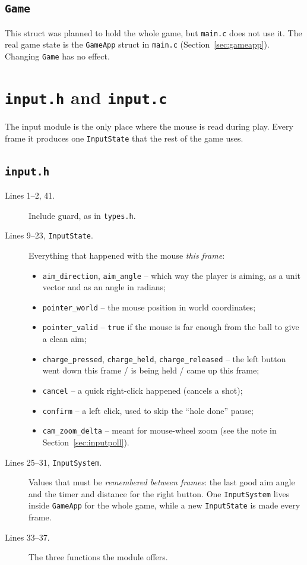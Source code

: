 \documentclass[11pt,a4paper]{article}
\newcommand{\code}[3]{}
\begin{document}
\subsection{\texttt{Game}}

\code{types.h}{98}{109}

This struct was planned to hold the whole game, but \texttt{main.c} does not use it. The real game state is the
\texttt{GameApp} struct in \texttt{main.c} (Section~\ref{sec:gameapp}). Changing \texttt{Game} has no effect.

\section{\texttt{input.h} and \texttt{input.c}}

The input module is the only place where the mouse is read during play. Every frame it produces one
\texttt{InputState} that the rest of the game uses.

\subsection{\texttt{input.h}}

\code{input.h}{1}{41}

\begin{description}
  \item[Lines 1--2, 41.] Include guard, as in \texttt{types.h}.
  \item[Lines 9--23, \texttt{InputState}.] Everything that happened with the mouse \emph{this frame}:
  \begin{itemize}
    \item \texttt{aim\_direction}, \texttt{aim\_angle} -- which way the player is aiming, as a unit vector and as an
    angle in radians;
    \item \texttt{pointer\_world} -- the mouse position in world coordinates;
    \item \texttt{pointer\_valid} -- \texttt{true} if the mouse is far enough from the ball to give a clean aim;
    \item \texttt{charge\_pressed}, \texttt{charge\_held}, \texttt{charge\_released} -- the left button went down this
    frame / is being held / came up this frame;
    \item \texttt{cancel} -- a quick right-click happened (cancels a shot);
    \item \texttt{confirm} -- a left click, used to skip the ``hole done'' pause;
    \item \texttt{cam\_zoom\_delta} -- meant for mouse-wheel zoom (see the note in Section~\ref{sec:inputpoll}).
  \end{itemize}
  \item[Lines 25--31, \texttt{InputSystem}.] Values that must be \emph{remembered between frames}: the last good
  aim angle and the timer and distance for the right button. One \texttt{InputSystem} lives inside \texttt{GameApp}
  for the whole game, while a new \texttt{InputState} is made every frame.
  \item[Lines 33--37.] The three functions the module offers.
\end{description}
\end{document}

